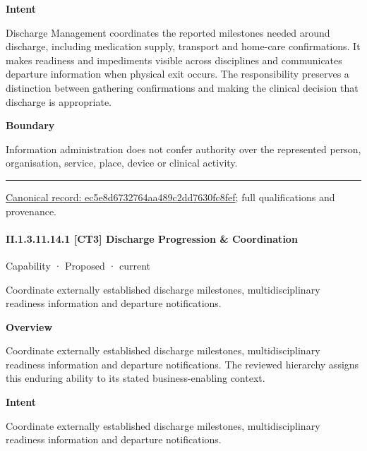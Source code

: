 \textbf{Intent}



Discharge Management coordinates the reported milestones needed around discharge, including medication supply, transport and home-care confirmations. It makes readiness and impediments visible across disciplines and communicates departure information when physical exit occurs. The responsibility preserves a distinction between gathering confirmations and making the clinical decision that discharge is appropriate.



\textbf{Boundary}



Information administration does not confer authority over the represented person, organisation, service, place, device or clinical activity.



\medskip\hrule\medskip

{\footnotesize \href{../../../../continuum/strategy/capability/ec5e8d6732764aa489c2dd7630fc8fef.md}{Canonical record: ec5e8d6732764aa489c2dd7630fc8fef}; full qualifications and provenance.}\par
\paragraph*{II.1.3.11.14.1 [CT3] Discharge Progression \& Coordination}
\label{navigation:II.1.3.11.14.1}

\label{element:d6048993146b45639bab27860f94f34f}
{\small Capability · Proposed · current}\par

Coordinate externally established discharge milestones, multidisciplinary readiness information and departure notifications.



\textbf{Overview}



Coordinate externally established discharge milestones, multidisciplinary readiness information and departure notifications. The reviewed hierarchy assigns this enduring ability to its stated business-enabling context.



\textbf{Intent}



Coordinate externally established discharge milestones, multidisciplinary readiness information and departure notifications.



